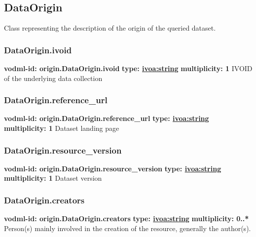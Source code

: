   \subsection{DataOrigin}
    \label{sect:origin.DataOrigin}
    Class representing the description of the origin of the queried dataset.

    \subsubsection{DataOrigin.ivoid}
    \textbf{vodml-id: origin.DataOrigin.ivoid} \newline
    \textbf{type: \hyperref[sect:ivoa]{ivoa:string}} \newline
    \textbf{multiplicity: 1} \newline
    IVOID of the underlying data collection

    \subsubsection{DataOrigin.reference\_url}
    \textbf{vodml-id: origin.DataOrigin.reference\_url} \newline
    \textbf{type: \hyperref[sect:ivoa]{ivoa:string}} \newline
    \textbf{multiplicity: 1} \newline
    Dataset landing page

    \subsubsection{DataOrigin.resource\_version}
    \textbf{vodml-id: origin.DataOrigin.resource\_version} \newline
    \textbf{type: \hyperref[sect:ivoa]{ivoa:string}} \newline
    \textbf{multiplicity: 1} \newline
    Dataset version

    \subsubsection{DataOrigin.creators}
    \textbf{vodml-id: origin.DataOrigin.creators} \newline
    \textbf{type: \hyperref[sect:ivoa]{ivoa:string}} \newline
    \textbf{multiplicity: 0..*} \newline
    Person(s) mainly involved in the creation of the resource, generally the author(s).


